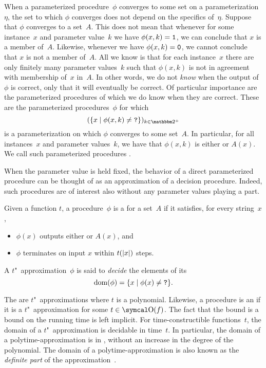 When a parameterized procedure~$\phi$ converges to some set on a parameterization~$\eta$, the set to which $\phi$ converges does not depend on the specifics of~$\eta$.
Suppose that $\phi$ converges to a set~$A$.
This does not mean that whenever for some instance~$x$ and parameter value~$k$ we have $\phi(x, k) = \textnormal{\texttt{1}}$, we can conclude that $x$ is a member of~$A$.
Likewise, whenever we have $\phi(x, k) = \textnormal{\texttt{0}}$, we cannot conclude that $x$ is not a member of~$A$.
All we know is that for each instance~$x$ there are only finitely many parameter values~$k$ such that $\phi(x, k)$ is not in agreement with membership of~$x$ in~$A$.
In other words, we do not \emph{know} when the output of~$\phi$ is correct, only that it will eventually be correct.
Of particular importance are the parameterized procedures of which we do know when they are correct.
These are the parameterized procedures~$\phi$ for which
\begin{equation*}
  (\{x \st \phi(x, k) \neq \bits{?}\})_{k \in \binary^+}
\end{equation*}
is a parameterization on which $\phi$ converges to some set~$A$.
In particular, for all instances~$x$ and parameter values~$k$, we have that $\phi(x, k)$ is either  or $A(x)$.
We call such parameterized procedures .

When the parameter value is held fixed, the behavior of a direct parameterized procedure can be thought of as an approximation of a decision procedure.
Indeed, such procedures are of interest also without any parameter values playing a part.
\begin{definition}
\label{def:approximation}%
  Given a function $t$, a procedure~$\phi$ is a  for a set~$A$ if it satisfies, for every string~$x$,
  \begin{itemize}
  \item $\phi(x)$ outputs either  or $A(x)$, and
  \item $\phi$ terminates on input $x$ within $t({\lvert x\rvert})$ steps.
  \end{itemize}
  A $t$"~approximation~$\phi$ is said to \emph{decide} the elements of its 
  \begin{equation*}
    \operatorname{dom}(\phi) = \{x \;|\; \phi(x) \neq \textnormal{\texttt{?}}\}.
  \end{equation*}
\end{definition}

The  \parencite{ko1981completeness,balcazar1985bi-immune} are $t$"~approximations where $t$ is a polynomial.
Likewise, a procedure is an  if it is a $t$"~approximation for some $t \in \bigO(f)$.
The fact that the bound is a bound on the running time is left implicit.
For time-constructible functions~$t$, the domain of a $t$"~approximation is decidable in time~$t$.
In particular, the domain of a polytime-approximation is in , without an increase in the degree of the polynomial.
The domain of a polytime-approximation is also known as the \emph{definite part} of the approximation~\parencite{ko1981completeness}.
